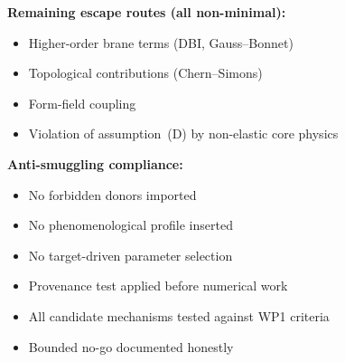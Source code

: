 \begin{resultbox}[title=NMCP WP2 Summary]
\textbf{Remaining escape routes (all non-minimal):}
\begin{itemize}
    \item Higher-order brane terms (DBI, Gauss--Bonnet)
    \item Topological contributions (Chern--Simons)
    \item Form-field coupling
    \item Violation of assumption~(D) by non-elastic core physics
\end{itemize}

\textbf{Anti-smuggling compliance:}
\begin{itemize}
    \item[$\checkmark$] No forbidden donors imported
    \item[$\checkmark$] No phenomenological profile inserted
    \item[$\checkmark$] No target-driven parameter selection
    \item[$\checkmark$] Provenance test applied before numerical work
    \item[$\checkmark$] All candidate mechanisms tested against WP1 criteria
    \item[$\checkmark$] Bounded no-go documented honestly
\end{itemize}
\end{resultbox}
